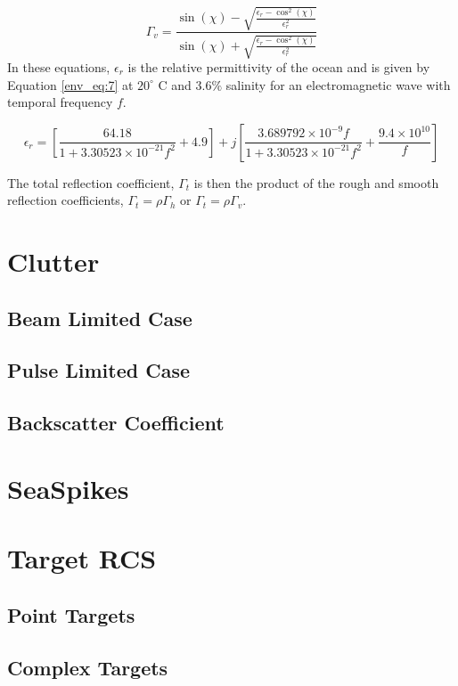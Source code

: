   \begin{equation}
  \label{env_eq:6}
 \Gamma_v = \frac{\sin(\chi)- \sqrt{\frac{\epsilon_r - \cos^2(\chi)}{\epsilon_r^2}}}{\sin(\chi) + \sqrt{\frac{\epsilon_r - \cos^2(\chi)}{\epsilon_r^2}}}
  \end{equation}
In these equations, $\epsilon_r$ is the relative permittivity of the ocean and is given by Equation \ref{env_eq:7} at $20^{\circ}$ C and $3.6\%$ salinity for an electromagnetic wave with temporal frequency $f$. 
  
\begin{equation}
  \label{env_eq:7}
\epsilon_r = \left[\frac{64.18}{1 + 3.30523\times 10^{-21}f^2} + 4.9 \right] + j\left[\frac{3.689792\times 10^{-9}f}{1 + 3.30523\times 10^{-21}f^2} + \frac{9.4\times 10^{10}}{f} \right]
  \end{equation}
  
The total reflection coefficient, $\Gamma_t$ is then the product of the rough and smooth reflection coefficients, $\Gamma_t = \rho\Gamma_h$ or $\Gamma_t = \rho\Gamma_v$.

\section{Clutter}
\subsection{Beam Limited Case}
\subsection{Pulse Limited Case}
\subsection{Backscatter Coefficient}

\section{SeaSpikes}

\section{Target RCS}
\subsection{Point Targets}
\subsection{Complex Targets}

